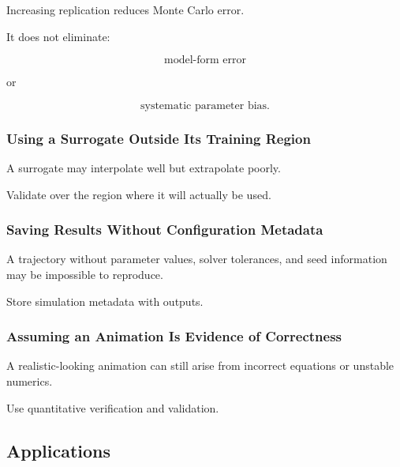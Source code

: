 Increasing replication reduces Monte Carlo error.

It does not eliminate:

\[
\boxed{
\text{model-form error}
}
\]

or

\[
\boxed{
\text{systematic parameter bias}.
}
\]

\subsubsection{Using a Surrogate Outside Its Training Region}

A surrogate may interpolate well but extrapolate poorly.

Validate over the region where it will actually be used.

\subsubsection{Saving Results Without Configuration Metadata}

A trajectory without parameter values, solver tolerances, and seed
information may be impossible to reproduce.

Store simulation metadata with outputs.

\subsubsection{Assuming an Animation Is Evidence of Correctness}

A realistic-looking animation can still arise from incorrect equations or
unstable numerics.

Use quantitative verification and validation.

\subsection{Applications}
\label{subsec:mathematical-simulation-applications}

